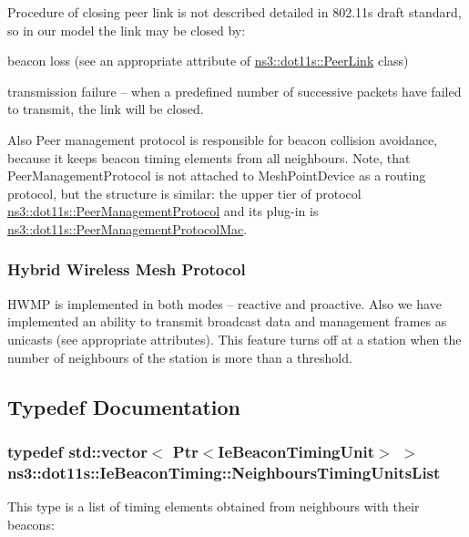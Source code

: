 Procedure of closing peer link is not described detailed in 802.\+11s draft standard, so in our model the link may be closed by\+:
\begin{DoxyItemize}
\item beacon loss (see an appropriate attribute of \hyperlink{classns3_1_1dot11s_1_1PeerLink}{ns3\+::dot11s\+::\+Peer\+Link} class)
\item transmission failure -- when a predefined number of successive packets have failed to transmit, the link will be closed.
\end{DoxyItemize}

Also Peer management protocol is responsible for beacon collision avoidance, because it keeps beacon timing elements from all neighbours. Note, that Peer\+Management\+Protocol is not attached to Mesh\+Point\+Device as a routing protocol, but the structure is similar\+: the upper tier of protocol \hyperlink{classns3_1_1dot11s_1_1PeerManagementProtocol}{ns3\+::dot11s\+::\+Peer\+Management\+Protocol} and its plug-\/in is \hyperlink{classns3_1_1dot11s_1_1PeerManagementProtocolMac}{ns3\+::dot11s\+::\+Peer\+Management\+Protocol\+Mac}.\hypertarget{group__dot11s_HWMP}{}\subsubsection{Hybrid Wireless Mesh Protocol}\label{group__dot11s_HWMP}
H\+W\+MP is implemented in both modes -- reactive and proactive. Also we have implemented an ability to transmit broadcast data and management frames as unicasts (see appropriate attributes). This feature turns off at a station when the number of neighbours of the station is more than a threshold. 

\subsection{Typedef Documentation}
\subsubsection[{\texorpdfstring{Neighbours\+Timing\+Units\+List}{NeighboursTimingUnitsList}}]{\setlength{\rightskip}{0pt plus 5cm}typedef std\+::vector$<$ Ptr$<$Ie\+Beacon\+Timing\+Unit$>$ $>$ {\bf ns3\+::dot11s\+::\+Ie\+Beacon\+Timing\+::\+Neighbours\+Timing\+Units\+List}}\hypertarget{group__dot11s_ga8dbec40aea7e1014f0af23de3b31a78c}{}\label{group__dot11s_ga8dbec40aea7e1014f0af23de3b31a78c}
This type is a list of timing elements obtained from neighbours with their beacons\+: 

